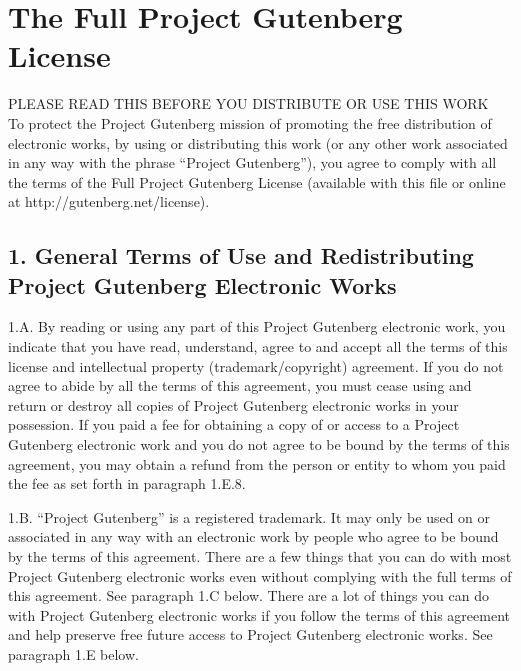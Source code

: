 \chapter*{The Full Project Gutenberg License}


PLEASE READ THIS BEFORE YOU DISTRIBUTE OR USE THIS WORK\\[.1in]

To protect the Project Gutenberg\texttrademark{} mission of promoting the free
distribution of electronic works, by using or distributing this work
(or any other work associated in any way with the phrase ``Project
Gutenberg''), you agree to comply with all the terms of the Full Project
Gutenberg\texttrademark{} License (available with this file or online at
http://gutenberg.net/license).


\section*{1. General Terms of Use and Redistributing Project Gutenberg\texttrademark{}
Electronic Works}

1.A.  By reading or using any part of this Project Gutenberg\texttrademark{}
electronic work, you indicate that you have read, understand, agree to
and accept all the terms of this license and intellectual property
(trademark/copyright) agreement.  If you do not agree to abide by all
the terms of this agreement, you must cease using and return or destroy
all copies of Project Gutenberg\texttrademark{} electronic works in your possession.
If you paid a fee for obtaining a copy of or access to a Project
Gutenberg\texttrademark{} electronic work and you do not agree to be bound by the
terms of this agreement, you may obtain a refund from the person or
entity to whom you paid the fee as set forth in paragraph 1.E.8.

1.B.  ``Project Gutenberg'' is a registered trademark.  It may only be
used on or associated in any way with an electronic work by people who
agree to be bound by the terms of this agreement.  There are a few
things that you can do with most Project Gutenberg\texttrademark{} electronic works
even without complying with the full terms of this agreement.  See
paragraph 1.C below.  There are a lot of things you can do with Project
Gutenberg\texttrademark{} electronic works if you follow the terms of this agreement
and help preserve free future access to Project Gutenberg\texttrademark{} electronic
works.  See paragraph 1.E below.

